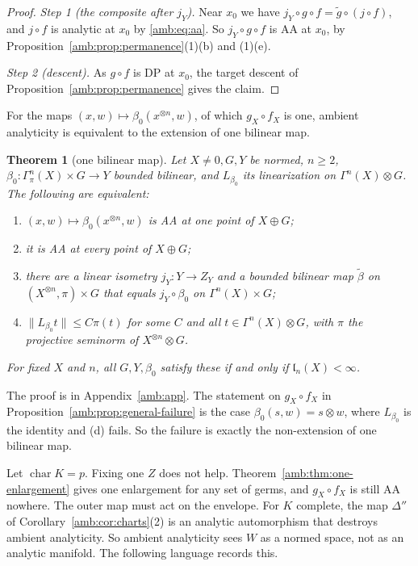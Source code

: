 \documentclass[11pt]{amsart}
\newtheorem{theorem}{Theorem}[section]
\theoremstyle{definition}
\theoremstyle{remark}
\numberwithin{equation}{section}
\newcommand{\norm}[1]{\lVert #1\rVert}
\theoremstyle{plain}
\theoremstyle{definition}
\theoremstyle{plain}
\begin{document}
\begin{proof}
\emph{Step 1 (the composite after $j_Y$).} Near $x_0$ we have $j_Y\circ g\circ f=\tilde g\circ(j\circ f)$, and $j\circ f$ is analytic at $x_0$ by \eqref{amb:eq:aa}. So $j_Y\circ g\circ f$ is AA at $x_0$, by Proposition~\ref{amb:prop:permanence}(1)(b) and (1)(e).

\emph{Step 2 (descent).} As $g\circ f$ is DP at $x_0$, the target descent of Proposition~\ref{amb:prop:permanence} gives the claim.
\end{proof}

For the maps $(x,w)\mapsto\beta_0(x^{\otimes n},w)$, of which $g_X\circ f_X$ is one, ambient analyticity is equivalent to the extension of one bilinear map.

\begin{theorem}[one bilinear map]\label{amb:thm:channel}
Let $X\ne0,G,Y$ be normed, $n\ge2$, $\beta_0\colon\Gamma^n_\pi(X)\times G\to Y$ bounded bilinear, and $L_{\beta_0}$ its linearization on $\Gamma^n(X)\otimes G$. The following are equivalent:
\begin{enumerate}
\item[\textup{(a)}] $(x,w)\mapsto\beta_0(x^{\otimes n},w)$ is AA at one point of $X\oplus G$;
\item[\textup{(b)}] it is AA at every point of $X\oplus G$;
\item[\textup{(c)}] there are a linear isometry $j_Y\colon Y\to Z_Y$ and a bounded bilinear map $\tilde\beta$ on $(X^{\otimes n},\pi)\times G$ that equals $j_Y\circ\beta_0$ on $\Gamma^n(X)\times G$;
\item[\textup{(d)}] $\norm{L_{\beta_0}t}\le C\pi(t)$ for some $C$ and all $t\in\Gamma^n(X)\otimes G$, with $\pi$ the projective seminorm of $X^{\otimes n}\otimes G$.
\end{enumerate}
For fixed $X$ and $n$, all $G,Y,\beta_0$ satisfy these if and only if $\mathfrak l_n(X)<\infty$.
\end{theorem}
The proof is in Appendix~\ref{amb:app}. The statement on $g_X\circ f_X$ in Proposition~\ref{amb:prop:general-failure} is the case $\beta_0(s,w)=s\otimes w$, where $L_{\beta_0}$ is the identity and (d) fails. So the failure is exactly the non-extension of one bilinear map.

Let $\operatorname{char}K=p$. Fixing one $Z$ does not help. Theorem~\ref{amb:thm:one-enlargement} gives one enlargement for any set of germs, and $g_X\circ f_X$ is still AA nowhere. The outer map must act on the envelope. For $K$ complete, the map $\Delta''$ of Corollary~\ref{amb:cor:charts}(2) is an analytic automorphism that destroys ambient analyticity. So ambient analyticity sees $W$ as a normed space, not as an analytic manifold. The following language records this.
\end{document}
